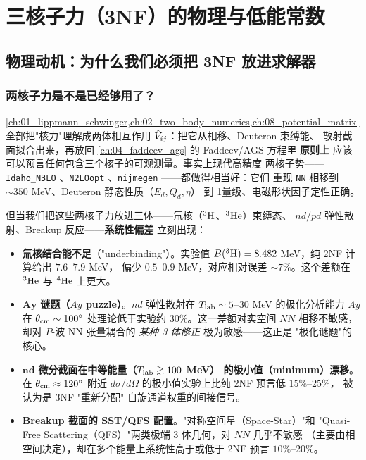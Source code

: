 
\chapter{三核子力（3NF）的物理与低能常数}
\label{ch:15_3nf_physics}

\section{物理动机：为什么我们必须把 3NF 放进求解器}
\label{sec:ch15-motivation}

\subsection{两核子力是不是已经够用了？}
\label{subsec:ch15-2nf-not-enough}

\cref{ch:01_lippmann_schwinger,ch:02_two_body_numerics,ch:08_potential_matrix}
全部把"核力"理解成两体相互作用 \(\hat{V}_{ij}\)：把它从相移、Deuteron 束缚能、
散射截面拟合出来，再放回 \cref{ch:04_faddeev_ags} 的 Faddeev/AGS 方程里
\textbf{原则上} 应该可以预言任何包含三个核子的可观测量。事实上现代高精度
两核子势——\texttt{Idaho\_N3LO} \cite{IdahoN3LO}、\texttt{N2LOopt}
\cite{N2LOopt}、\texttt{nijmegen} \cite{NijmegenII}——都做得相当好：它们
重现 \texttt{NN} 相移到 \(\sim 350\) MeV、Deuteron 静态性质（\(E_d, Q_d, \eta\)）
到 1\textperthousand 量级、电磁形状因子定性正确。

但当我们把这些两核子力放进三体——氚核（\(^3{\rm H}\)、\(^3{\rm He}\)）束缚态、
\(nd / pd\) 弹性散射、Breakup 反应——\textbf{系统性偏差} 立刻出现：

\begin{itemize}
\item \textbf{氚核结合能不足}（"underbinding"）。实验值
      \(B(^3{\rm H}) = 8.482\) MeV，纯 2NF 计算给出 \(7.6\)–\(7.9\) MeV，
      偏少 \(0.5\)–\(0.9\) MeV，对应相对误差 \(\sim 7\%\)。这个差额在
      \(^3{\rm He}\) 与 \(^4{\rm He}\) 上更大。
\item \(\boldsymbol{Ay}\) \textbf{谜题（\(Ay\) puzzle）}。\(nd\) 弹性散射在
      \({T_{\text{lab}}} \sim 5\)–\(30\) MeV 的极化分析能力 \(Ay\) 在 \(\theta_{\rm cm} \sim 100^\circ\)
      处理论低于实验约 \(30\%\)。这一差额对实空间 \(NN\) 相移不敏感，
      却对 \(P\)-波 NN 张量耦合的 \emph{某种 3 体修正} 极为敏感——这正是
      "极化谜题"的核心。
\item \(\boldsymbol{nd}\) \textbf{微分截面在中等能量（\({T_{\text{lab}}} \gtrsim 100\) MeV）
      的极小值（minimum）漂移}。在 \(\theta_{\rm cm} \approx 120^\circ\)
      附近 \(d\sigma/d\Omega\) 的极小值实验上比纯 2NF 预言低 \(15\%\)–\(25\%\)，
      被认为是 3NF "重新分配" 自旋通道权重的间接信号。
\item \textbf{Breakup 截面的 SST/QFS 配置}。"对称空间星（Space-Star）"和
      "Quasi-Free Scattering（QFS）"两类极端 3 体几何，对 \(NN\) 几乎不敏感
      （主要由相空间决定），却在多个能量上系统性高于或低于 2NF 预言
      \(10\%\)–\(20\%\)。
\end{itemize}

